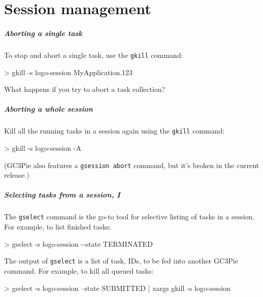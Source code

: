 \documentclass[english,serif,mathserif,usenames,dvipsnames]{beamer}
\begin{document}
\part{Session management}

\begin{frame}
  \frametitle{Aborting a single task}

  To stop and abort a single task, use the \texttt{gkill} command:
\begin{semiverbatim}
    > gkill -s logo-session MyApplication.123
\end{semiverbatim}

  \pause
  \begin{exercise*}
    What happens if you try to abort a task collection?
  \end{exercise*}
\end{frame}

\begin{frame}
  \frametitle{Aborting a whole session}

  \alert{Kill all the running tasks} in a session again using the
  \texttt{gkill} command:
\begin{semiverbatim}
    > gkill -s logo-session -A
\end{semiverbatim}

  \+ (GC3Pie also features a \texttt{gsession abort} command, but it's
  broken in the current release.)
\end{frame}


\begin{frame}[fragile]
  \frametitle{Selecting tasks from a session, I}

  The \texttt{gselect} command is the go-to tool for selective listing
  of tasks in a session.  For example, to list finished tasks:
\begin{semiverbatim}
    > gselect -s logo-session -{}-state TERMINATED
\end{semiverbatim}

  \+ The output of \texttt{gselect} is a list of task, IDs, to be fed
  into another GC3Pie command.  For example, to kill all queued tasks:
  \begin{stdout}
    > gselect -s logo-session --state SUBMITTED | xargs gkill -s logo-session
  \end{stdout}
\end{frame}
\end{document}
